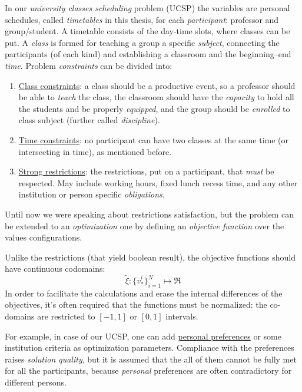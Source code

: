 \documentclass[../ThesisDoc]{subfiles}
\begin{document}
  In our \emph{university classes scheduling} problem (UCSP) the variables
are personal schedules, called \emph{timetables} in this thesis,
for each \emph{participant}: professor and group/student.
  A timetable consists of the day-time slots, where classes can be put.
  A \emph{class} is formed for teaching a group a specific \emph{subject},
connecting the participants (of each kind) and establishing a classroom and
the beginning--end \emph{time}.
  Problem \emph{constraints} can be divided into:
\begin{enumerate}
  \item \underline{Class constraints}: a class should be a productive event, so
    a professor should be able to \emph{teach} the class, the classroom should
    have the \emph{capacity} to hold all the students and be properly \emph{equipped},
    and the group should be \emph{enrolled} to class subject
    (further called \emph{discipline}).
  \item \underline{Time constraints}: no participant can have two classes
    at the same time (or intersecting in time), as mentioned before.
  \item \underline{Strong restrictions}: the restrictions, put on a participant, that
    \emph{must} be respected. May include working hours, fixed lunch recess time,
    and any other institution or person specific \emph{obligations}.
\end{enumerate}

\bigskip

  Until now we were speaking about restrictions satisfaction, but the problem can
be extended to an \emph{optimization} one by defining an
\emph{objective function} over the values configurations.

  Unlike the restrictions (that yield boolean result), the objective functions
should have continuous codomains:
$$\tilde\xi : \{{\dot v}^i_\ast\}_{i=1}^N \mapsto \Re$$
  In order to facilitate the calculations and erase the internal differences of
the objectives, it's often required that the functions must be normalized:
the co-domains are restricted to $[-1,1]$ or $[0,1]$ intervals.

  For example, in case of our UCSP,
one can add \underline{personal preferences} or some institution criteria as
optimization parameters.
  Compliance with the preferences raises \emph{solution quality},
but it is assumed that the all of them cannot be fully met for all the
participants, because \emph{personal} preferences are often
contradictory for different persons.
\end{document}
